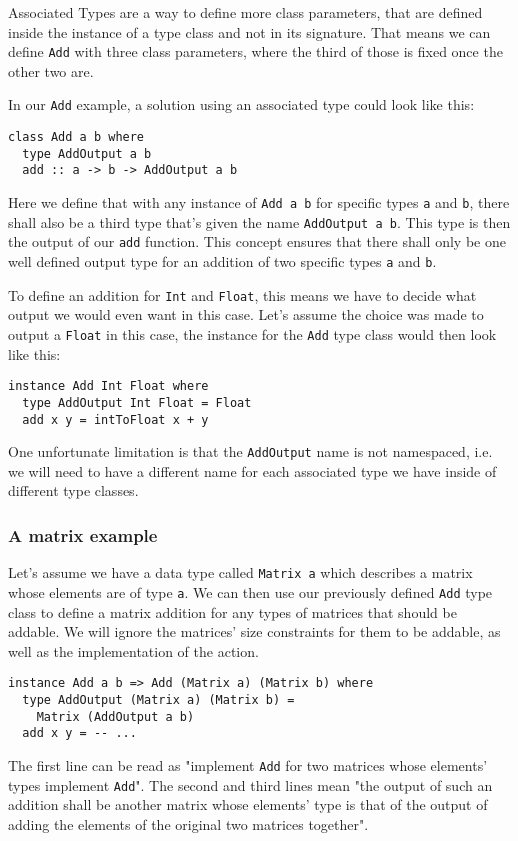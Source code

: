 Associated Types are a way to define more class parameters, that are defined inside the instance of a type class and not in its signature. That means we can define \verb|Add| with three class parameters, where the third of those is fixed once the other two are.

In our \verb|Add| example, a solution using an associated type could look like this:
\begin{verbatim}
class Add a b where
  type AddOutput a b
  add :: a -> b -> AddOutput a b
\end{verbatim}
Here we define that with any instance of \verb|Add a b| for specific types \verb|a| and \verb|b|, there shall also be a third type that's given the name \verb|AddOutput a b|. This type is then the output of our \verb|add| function. This concept ensures that there shall only be one well defined output type for an addition of two specific types \verb|a| and \verb|b|.

To define an addition for \verb|Int| and \verb|Float|, this means we have to decide what output we would even want in this case. Let's assume the choice was made to output a \verb|Float| in this case, the instance for the \verb|Add| type class would then look like this:
\begin{verbatim}
instance Add Int Float where
  type AddOutput Int Float = Float
  add x y = intToFloat x + y
\end{verbatim}
One unfortunate limitation is that the \verb|AddOutput| name is not namespaced, i.e. we will need to have a different name for each associated type we have inside of different type classes.

\subsubsection{A matrix example}

Let's assume we have a data type called \verb|Matrix a| which describes a matrix whose elements are of type \verb|a|. We can then use our previously defined \verb|Add| type class to define a matrix addition for any types of matrices that should be addable. We will ignore the matrices' size constraints for them to be addable, as well as the implementation of the action.
\begin{verbatim}
instance Add a b => Add (Matrix a) (Matrix b) where
  type AddOutput (Matrix a) (Matrix b) =
    Matrix (AddOutput a b)
  add x y = -- ...
\end{verbatim}
The first line can be read as "implement \verb|Add| for two matrices whose elements' types implement \verb|Add|". The second and third lines mean "the output of such an addition shall be another matrix whose elements' type is that of the output of adding the elements of the original two matrices together".

